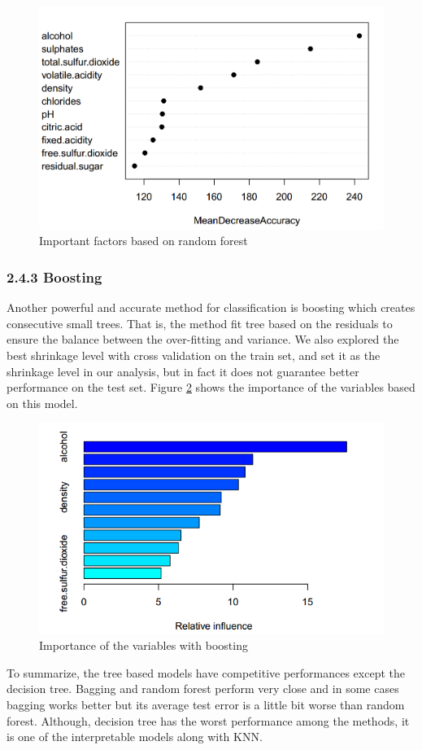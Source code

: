 \documentclass{article}
\begin{document}
\begin{figure}[H]
    \centering
    \includegraphics[scale=0.65]{RandomForest3.PNG}
    \caption{Important factors based on random forest}
    \label{fig:RF3}
\end{figure}

\subsubsection{2.4.3  Boosting}
Another powerful and accurate method for classification is boosting which creates consecutive small trees. That is, the method fit tree based on the residuals to ensure the balance between the over-fitting and variance. We also explored the best shrinkage level with cross validation on the train set, and set it as the shrinkage level in our analysis, but in fact it does not guarantee better performance on the test set. Figure \ref{Boosting} shows the importance of the variables based on this model.
\begin{figure}[H]
    \centering
    \includegraphics[scale=0.6]{Boosting.PNG}
    \caption{Importance of the variables with boosting}
    \label{Boosting}
\end{figure}
To summarize, the tree based models have competitive performances except the decision tree. Bagging and random forest perform very close and in some cases bagging works better but its average test error is a little bit worse than random forest. Although, decision tree has the worst performance among the methods, it is one of the interpretable models along with KNN.
\end{document}
